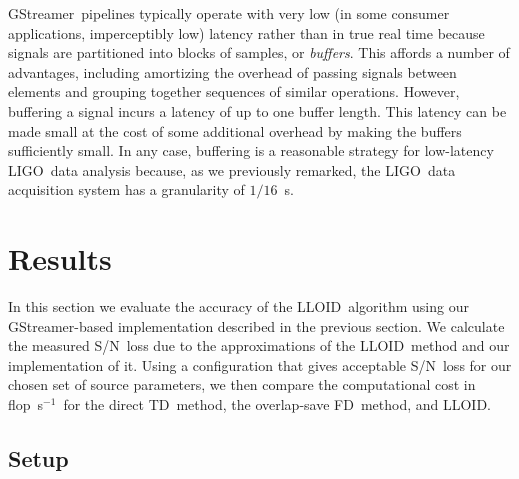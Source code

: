 \documentclass[preprint2]{aastex}
\newcommand{\LIGO}{LIGO}%
\newcommand{\SNR}{S/N}%
\newcommand{\flops}{flop~s$^{-1}$}
\newcommand{\gstreamer}{GStreamer}
\newcommand{\lloid}{LLOID}%
\newcommand{\TD}{TD}%
\newcommand{\FD}{FD}%
\begin{document}
\gstreamer\ pipelines typically operate with very low (in some consumer
applications, imperceptibly low) latency rather than in true real time because
signals are partitioned into blocks of samples, or \emph{buffers}.  This affords
a number of advantages, including amortizing the overhead of passing signals
between elements and grouping together sequences of similar operations.
However, buffering a signal incurs a latency of up to one buffer length.  This
latency can be made small at the cost of some additional overhead by making the
buffers sufficiently small.  In any case, buffering is a reasonable strategy for low-latency \LIGO\ data analysis because, as we previously remarked, the \LIGO\ data acquisition system has a granularity of $1/16$~s.

\section{Results}

In this section we evaluate the accuracy of the \lloid\ algorithm using our 
\gstreamer{}-based implementation described in the previous section. We calculate
the measured \SNR\ loss due to the approximations of the \lloid\ method and our
implementation of it. Using a configuration that gives acceptable \SNR\ loss
for our chosen set of source parameters, we then compare the computational cost
in \flops\ for the direct \TD\ method, the overlap-save \FD\ method, and \lloid.

\subsection{Setup}
\label{sec:bank-setup}
\end{document}

